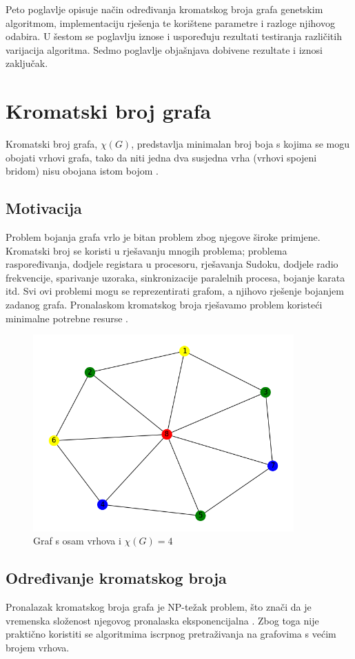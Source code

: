 \documentclass[times, utf8, zavrsni, numeric]{fer}
\begin{document}
Peto poglavlje opisuje način određivanja kromatskog broja grafa genetskim algoritmom, implementaciju rješenja te korištene parametre i razloge njihovog odabira. U šestom se poglavlju iznose i uspoređuju rezultati testiranja različitih varijacija algoritma. Sedmo poglavlje objašnjava dobivene rezultate i iznosi zaključak.

\chapter{Kromatski broj grafa}
Kromatski broj grafa, $\chi(G)$, predstavlja minimalan broj boja s kojima se mogu obojati vrhovi grafa, tako da niti jedna dva susjedna vrha (vrhovi spojeni bridom) nisu obojana istom bojom \cite{kovaceviv2020diskretna}. 

\section{Motivacija}
Problem bojanja grafa vrlo je bitan problem zbog njegove široke primjene. Kromatski broj se koristi u rješavanju mnogih problema; problema raspoređivanja, dodjele registara u procesoru, rješavanja Sudoku, dodjele radio frekvencije, sparivanje uzoraka, sinkronizacije paralelnih procesa, bojanje karata itd. Svi ovi problemi mogu se reprezentirati grafom, a njihovo rješenje bojanjem zadanog grafa. Pronalaskom kromatskog broja rješavamo problem koristeći minimalne potrebne resurse \cite{rajagaspar2022applications}. 

\begin{figure}[htb]
\centering
\includegraphics[width=10cm]{images/8_vertices_example.png}
\caption{Graf s osam vrhova i $\chi(G)=4$}
\label{fig:graf s obojanim vrhovima}
\end{figure}

\section{Određivanje kromatskog broja}
Pronalazak kromatskog broja grafa je NP-težak problem, što znači da je vremenska složenost njegovog pronalaska eksponencijalna \cite{shen2003solving}. Zbog toga nije praktično koristiti se algoritmima iscrpnog pretraživanja na grafovima s većim brojem vrhova.
\end{document}
